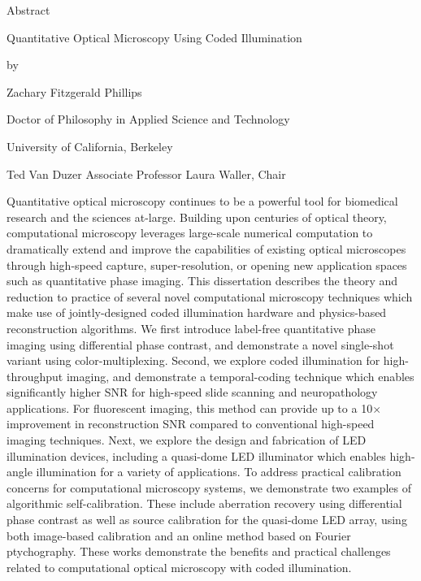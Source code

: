 \setcounter{page}{1}

\begin{center}
    Abstract

    \vspace{0.4cm}
     Quantitative Optical Microscopy Using Coded Illumination

    \vspace{0.4cm}

    by

    \vspace{0.4cm}
    Zachary Fitzgerald Phillips

     \vspace{0.4cm}
     Doctor of Philosophy in Applied Science and Technology

     \vspace{0.4cm}
     University of California, Berkeley

     \vspace{0.4cm}
     Ted Van Duzer Associate Professor Laura Waller, Chair

    \vspace{0.8cm}


\end{center}


Quantitative optical microscopy continues to be a powerful tool for biomedical research and the sciences at-large. Building upon centuries of optical theory, computational microscopy leverages large-scale numerical computation to dramatically extend and improve the capabilities of existing optical microscopes through high-speed capture, super-resolution, or opening new application spaces such as quantitative phase imaging. This dissertation describes the theory and reduction to practice of several novel computational microscopy techniques which make use of jointly-designed coded illumination hardware and physics-based reconstruction algorithms. We first introduce label-free quantitative phase imaging using differential phase contrast, and demonstrate a novel single-shot variant using color-multiplexing. Second, we explore coded illumination for high-throughput imaging, and demonstrate a temporal-coding technique which enables significantly higher SNR for high-speed slide scanning and neuropathology applications. For fluorescent imaging, this method can provide up to a 10$\times$ improvement in reconstruction SNR compared to conventional high-speed imaging techniques. Next, we explore the design and fabrication of LED illumination devices, including a quasi-dome LED illuminator which enables high-angle illumination for a variety of applications. To address practical calibration concerns for computational microscopy systems, we demonstrate two examples of algorithmic self-calibration. These include aberration recovery using differential phase contrast as well as source calibration for the quasi-dome LED array, using both image-based calibration and an online method based on Fourier ptychography. These works demonstrate the benefits and practical challenges related to computational optical microscopy with coded illumination.
